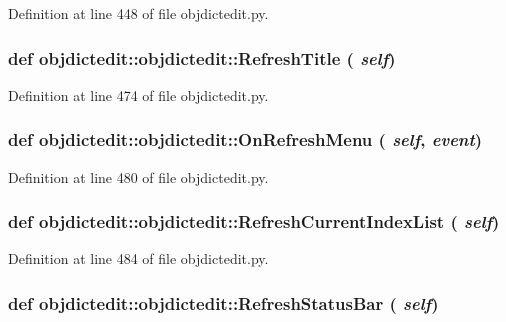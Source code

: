 Definition at line 448 of file objdictedit.py.\hypertarget{classobjdictedit_1_1objdictedit_ae8f91209a1bc14a0b7b7b62475d7f59}{
\subsubsection[RefreshTitle]{\setlength{\rightskip}{0pt plus 5cm}def objdictedit::objdictedit::Refresh\-Title ( {\em self})}}
\label{classobjdictedit_1_1objdictedit_ae8f91209a1bc14a0b7b7b62475d7f59}




Definition at line 474 of file objdictedit.py.\hypertarget{classobjdictedit_1_1objdictedit_88ca3cd196a27f86a3253599b588ee4c}{
\subsubsection[OnRefreshMenu]{\setlength{\rightskip}{0pt plus 5cm}def objdictedit::objdictedit::On\-Refresh\-Menu ( {\em self},  {\em event})}}
\label{classobjdictedit_1_1objdictedit_88ca3cd196a27f86a3253599b588ee4c}




Definition at line 480 of file objdictedit.py.\hypertarget{classobjdictedit_1_1objdictedit_555d5c79e43419d21eca542c42de567d}{
\subsubsection[RefreshCurrentIndexList]{\setlength{\rightskip}{0pt plus 5cm}def objdictedit::objdictedit::Refresh\-Current\-Index\-List ( {\em self})}}
\label{classobjdictedit_1_1objdictedit_555d5c79e43419d21eca542c42de567d}




Definition at line 484 of file objdictedit.py.\hypertarget{classobjdictedit_1_1objdictedit_91f233bc35906db726537b4dc4a51d28}{
\subsubsection[RefreshStatusBar]{\setlength{\rightskip}{0pt plus 5cm}def objdictedit::objdictedit::Refresh\-Status\-Bar ( {\em self})}}
\label{classobjdictedit_1_1objdictedit_91f233bc35906db726537b4dc4a51d28}




